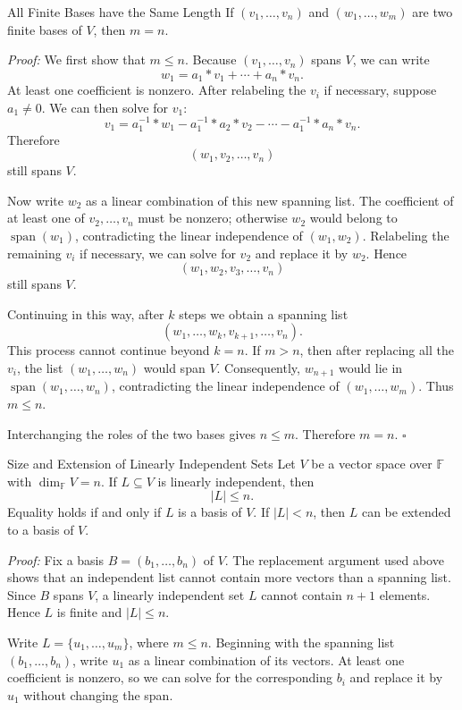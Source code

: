 \documentclass[a4paper,11pt,abstract=true]{scrartcl}
\theoremstyle{dotlessP}
\theoremstyle{dotlessS}
\theoremstyle{remark}
\theoremstyle{definition}
\begin{document}
\begin{mainbox}{All Finite Bases have the Same Length}
If
$(v_1,\ldots,v_n)$ and $(w_1,\ldots,w_m)$ are two finite bases of $V$, then
$m=n$.
\end{mainbox}

\textit{Proof:} We first show that $m\leq n$. Because
$(v_1,\ldots,v_n)$ spans $V$, we can write
\[
w_1=a_1*v_1+\cdots+a_n*v_n.
\]
At least one coefficient is nonzero. After relabeling the $v_i$ if necessary,
suppose $a_1\neq0$. We can then solve for $v_1$:
\[
v_1=a_1^{-1}*w_1-a_1^{-1}*a_2*v_2-\cdots-a_1^{-1}*a_n*v_n.
\]
Therefore
\[
(w_1,v_2,\ldots,v_n)
\]
still spans $V$.

Now write $w_2$ as a linear combination of this new spanning list. The
coefficient of at least one of $v_2,\ldots,v_n$ must be nonzero; otherwise
$w_2$ would belong to $\operatorname{span}(w_1)$, contradicting the linear
independence of $(w_1,w_2)$. Relabeling the remaining $v_i$ if necessary, we
can solve for $v_2$ and replace it by $w_2$. Hence
\[
(w_1,w_2,v_3,\ldots,v_n)
\]
still spans $V$.

Continuing in this way, after $k$ steps we obtain a spanning list
\[
(w_1,\ldots,w_k,v_{k+1},\ldots,v_n).
\]
This process cannot continue beyond $k=n$. If $m>n$, then after replacing all
the $v_i$, the list $(w_1,\ldots,w_n)$ would span $V$. Consequently,
$w_{n+1}$ would lie in $\operatorname{span}(w_1,\ldots,w_n)$, contradicting
the linear independence of $(w_1,\ldots,w_m)$. Thus $m\leq n$.

Interchanging the roles of the two bases gives $n\leq m$. Therefore
$m=n$. \hfill$\square$

\begin{mainbox}{Size and Extension of Linearly Independent Sets} Let $V$
be a vector space over $\mathbb{F}$ with $\dim_{\mathbb{F}} V=n$. If $L\subseteq V$ is linearly
independent, then
\[
|L|\leq n.
\]
Equality holds if and only if $L$ is a basis of $V$. If $|L|<n$, then $L$
can be extended to a basis of $V$.
\end{mainbox}

\textit{Proof:} Fix a basis $B=(b_1,\ldots,b_n)$ of $V$. The replacement
argument used above shows that an independent list cannot contain more
vectors than a spanning list. Since $B$ spans $V$, a linearly independent set
$L$ cannot contain $n+1$ elements. Hence $L$ is finite and $|L|\leq n$.

Write $L=\{u_1,\ldots,u_m\}$, where $m\leq n$. Beginning with the spanning
list $(b_1,\ldots,b_n)$, write $u_1$ as a linear combination of its vectors.
At least one coefficient is nonzero, so we can solve for the corresponding
$b_i$ and replace it by $u_1$ without changing the span.
\end{document}
